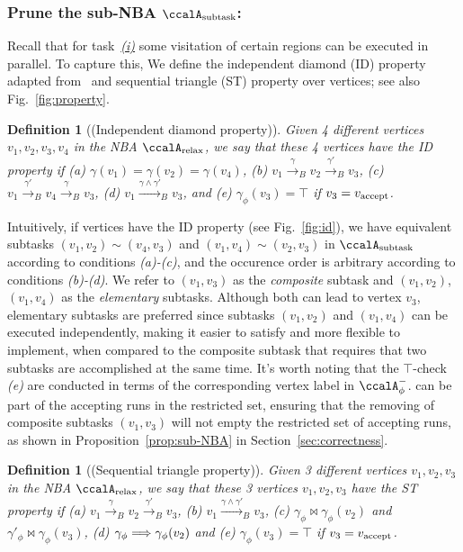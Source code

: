\documentclass[Afour,sageh,times]{sagej}
\newtheorem{defn}[thm]{Definition}
\newcommand{\auto}[1]{\ccalA_{\textup{#1}}}
\newcommand{\autop}{\ccalA_{\phi}}
\newcommand{\vertex}[1]{v_{\textup{#1}}}
\newcommand{\simplies}{\DOTSB\Longrightarrow}
\begin{document}
  \subsubsection{Prune the sub-NBA \upshape $\auto{subtask}$:} \label{sub-NBA:2}
Recall that for task~\hyperref[task:i]{\it (i)}  some visitation of certain regions can be executed in parallel. To capture this, We define the independent diamond (ID) property adapted from~\cite{stefanescu2006automatic}  and sequential triangle (ST) property over vertices; see also Fig.~\ref{fig:property}.
\begin{defn}[(Independent diamond property)]\label{defn:id}
  Given 4 different vertices $v_1, v_2, v_3, v_4$ in the NBA $\auto{relax}$, we say that these 4 vertices have the ID property if (a) $\gamma(v_1) = \gamma(v_2) = \gamma(v_4)$, (b) $v_1 \xrightarrow{\gamma}_B v_2 \xrightarrow{\gamma'}_B v_3$, (c) $v_1 \xrightarrow{\gamma'}_B v_4 \xrightarrow{\gamma}_B v_3$,  (d) $v_1 \xrightarrow{\gamma \wedge \gamma'}_B v_3$, and (e) $\gamma_\phi(v_3) = \top$ if $v_3 = \vertex{accept}$.
\end{defn}
Intuitively, if vertices have the ID property (see Fig.~\ref{fig:id}), we have equivalent subtasks $(v_1, v_2) \sim (v_4, v_3)$ and $(v_1, v_4) \sim (v_2, v_3)$ in $\auto{subtask}$ according to conditions {\it (a)-(c)}, and the occurence order is arbitrary according to conditions {\it (b)-(d)}.  We refer to $(v_1, v_3)$ as the {\it composite} subtask and $(v_1, v_2)$, $(v_1, v_4)$ as the {\it elementary} subtasks.  Although both can lead to vertex $v_3$, elementary subtasks are preferred since subtasks $(v_1, v_2)$ and $(v_1, v_4)$ can be executed independently, making it easier to satisfy and more flexible to implement, when compared to the composite subtask that requires that two subtasks are accomplished at the same time. It's worth noting that the $\top$-check {\it (e)} are conducted in terms of the corresponding vertex label in $\autop^-$.  can be part of the accepting runs in the restricted set, ensuring that the removing of composite subtasks $(v_1, v_3)$ will not empty the restricted set of accepting runs, as shown in Proposition~\ref{prop:sub-NBA} in Section~\ref{sec:correctness}.
\begin{defn}[(Sequential triangle property)]\label{defn:st}
  Given 3 different vertices $v_1, v_2, v_3$ in the NBA $\auto{relax}$, we say that these 3 vertices $v_1, v_2, v_3$ have the ST property if %
(a) $v_1 \xrightarrow{\gamma}_B v_2 \xrightarrow{\gamma'}_B v_3$,  (b) $v_1 \xrightarrow{\gamma \wedge \gamma'}_B v_3$, (c)  $\gamma_\phi \bowtie \gamma_\phi(v_2)$ and  $\gamma'_\phi \bowtie \gamma_\phi(v_3)$, (d) $\gamma_\phi \simplies \gamma_\phi(v_2)$  and (e) $\gamma_\phi(v_3) = \top$ if $v_3 = \vertex{accept}$.
\end{defn}
\end{document}
